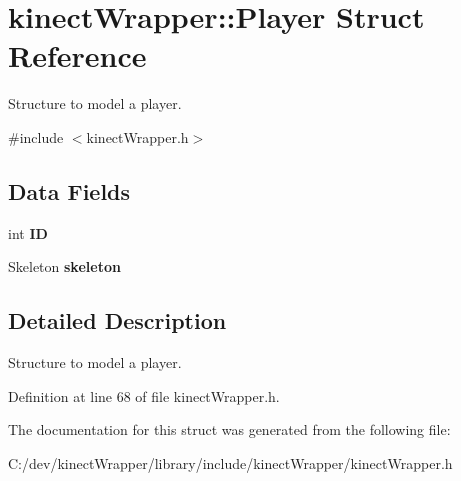 \section{kinect\+Wrapper\+:\+:Player Struct Reference}
\label{structkinectWrapper_1_1Player}


Structure to model a player.  




{\ttfamily \#include $<$kinect\+Wrapper.\+h$>$}

\subsection*{Data Fields}
\begin{DoxyCompactItemize}
\item 
int {\bfseries I\+D}\label{structkinectWrapper_1_1Player_a9247d884d641c97fef238d71ca59eb71}

\item 
Skeleton {\bfseries skeleton}\label{structkinectWrapper_1_1Player_a8d401014445c61c049db52523cf3d5f1}

\end{DoxyCompactItemize}


\subsection{Detailed Description}
Structure to model a player. 

Definition at line 68 of file kinect\+Wrapper.\+h.



The documentation for this struct was generated from the following file\+:\begin{DoxyCompactItemize}
\item 
C\+:/dev/kinect\+Wrapper/library/include/kinect\+Wrapper/kinect\+Wrapper.\+h\end{DoxyCompactItemize}
